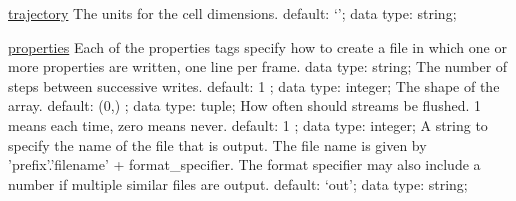 \begin{ipifield}{}
\begin{ipifield}{\hyperref[TRAJECTORY]{trajectory}}
{%
{The units for the cell dimensions.}%
{default: `'; data type: string; }%
}
\end{ipifield}
\begin{ipifield}{\hyperref[PROPERTIES]{properties}}%
{Each of the properties tags specify how to create a file in which one or more properties are written, one line per frame. }%
{data type: string; }%
{%
{The number of steps between successive writes.}%
{default:  1 ; data type: integer; }%
%
{The shape of the array.}%
{default:  (0,) ; data type: tuple; }%
%
{How often should streams be flushed. 1 means each time, zero means never.}%
{default:  1 ; data type: integer; }%
%
{A string to specify the name of the file that is output. The file name is given by 'prefix'.'filename' + format\_specifier. The format specifier may also include a number if multiple similar files are output.}%
{default: `out'; data type: string; }%
}
\end{ipifield}
\end{ipifield}

